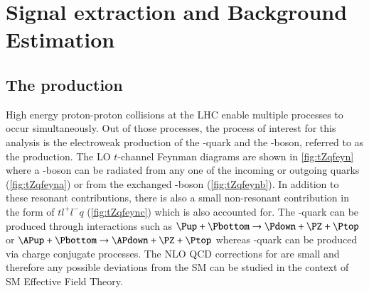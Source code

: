 
\chapter{Signal extraction and Background Estimation}
\label{sec:tZq}

\section{The \tZqsec production}
High energy proton-proton collisions at the LHC enable
multiple processes to occur simultaneously. Out of those processes, the process of 
interest for this analysis 
is the electroweak production of the \Ptop-quark and the 
\PZ-boson, referred to as the \tZq production. The LO $t$-channel Feynman diagrams are shown in \cref{fig:tZqfeyn} where
a \PZ-boson can be radiated from any one of the incoming or outgoing quarks (\cref{fig:tZqfeyna})
or from the exchanged \PW-boson (\cref{fig:tZqfeynb}). In addition to these
resonant contributions, there is also a small non-resonant contribution 
in the form of $tl^+l^-q$ (\cref{fig:tZqfeync}) which is also accounted for. The \Ptop-quark can be produced through
interactions such as $\Pup+\Pbottom \rightarrow \Pdown+\PZ+\Ptop$ or 
$\APup+\Pbottom \rightarrow \APdown+\PZ+\Ptop$ whereas \APtop-quark can be produced 
via charge conjugate processes. The NLO QCD
corrections for \tZq are small and therefore any possible deviations from the SM can be 
studied in the context of SM Effective Field Theory. 



